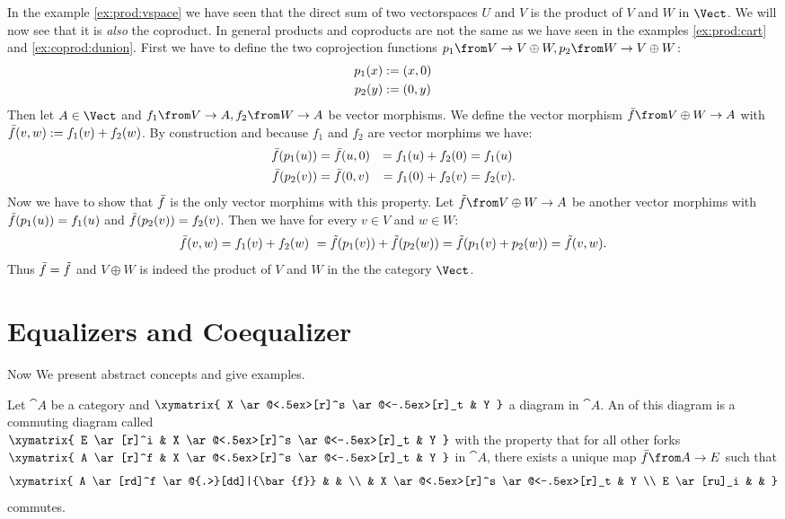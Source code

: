 \begin{example}
  \label{ex:coprod:vspace}
  In the example \ref{ex:prod:vspace} we have seen that the direct sum of two vectorspaces $U$ and $V$ is the product of $V$ and $W$ in $\Vect$.
  We will now see that it is \emph{also} the coproduct.
  In general products and coproducts are not the same as we have seen in the examples \ref{ex:prod:cart} and \ref{ex:coprod:dunion}.
  First we have to define the two coprojection functions $p_1 \from V \to V \oplus W, p_2 \from W \to V \oplus W$:
  \begin{alignat*}{2}
    p_1(x) &:= \left( x , 0 \right) \\
    p_2(y) &:= \left( 0 , y \right)
  \end{alignat*}
  Then let $A \in \Vect$ and $f_1 \from V \to A, f_2 \from W \to A$ be vector morphisms.
  We define the vector morphism $\fbar \from V \oplus W \to A$ with $\bar{f}(v, w) := f_1(v) + f_2(w)$.
  By construction and because $f_1$ and $f_2$ are vector morphims we have:
  \begin{alignat*}{4}
    \bar{f}(p_1(u)) &= \bar{f}(u, 0) &= f_1(u) + f_2(0) &= f_1(u) \\
    \bar{f}(p_2(v)) &= \bar{f}(0, v) &= f_1(0) + f_2(v) &= f_2(v).
  \end{alignat*}
  Now we have to show that $\bar{f}$ is the only vector morphims with this property.
  Let $\ftilde \from V \oplus W \to A$ be another vector morphims with $\tilde{f}(p_1(u)) = f_1(u)$ and $\tilde{f}(p_2(v)) = f_2(v)$.
  Then we have for every $v \in V$ and $w \in W$:
  $$ \bar{f}(v,w) = f_1(v) + f_2(w)\ = \tilde{f}(p_1(v)) + \tilde{f}(p_2(w)) = \tilde{f}(p_1(v) + p_2(w)) = \tilde{f}(v, w). $$
  Thus $\bar{f} = \tilde{f}$ and $V \oplus W$ is indeed the product of $V$ and $W$ in the the category $\Vect$.
\end{example}

\section*{Equalizers and Coequalizer}

Now We present abstract concepts and give examples.

\begin{definition}[Equalizer]
  \label{def:equa}
  Let $\cat{A}$ be a category and
  $ \xymatrix{
    X \ar@<.5ex>[r]^s \ar@<-.5ex>[r]_t & Y
  } $
  a diagram in $\cat{A}$.
  An  of this diagram is a commuting diagram called  \\
  $ \xymatrix{
    E \ar[r]^i & X \ar@<.5ex>[r]^s \ar@<-.5ex>[r]_t & Y
  } $
  with the property that for all other forks
  $ \xymatrix{
    A \ar[r]^f & X \ar@<.5ex>[r]^s \ar@<-.5ex>[r]_t & Y
  } $
  in $\cat{A}$, there exists a unique map $\bar{f}\from A \to E$ such that
  \[ \xymatrix{
    A \ar[rd]^f \ar@{.>}[dd]|{\bar{f}} & & \\
    & X \ar@<.5ex>[r]^s \ar@<-.5ex>[r]_t & Y \\
    E \ar[ru]_i & &
  } \]
  commutes.
\end{definition}

